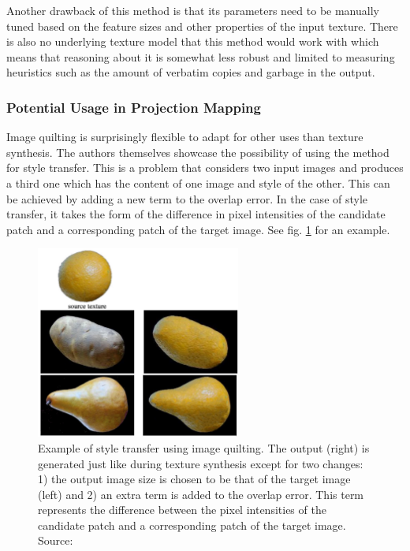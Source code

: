 Another drawback of this method is that its parameters need to be manually tuned based on the feature sizes and other properties of the input texture. There is also no underlying texture model that this method would work with which means that reasoning about it is somewhat less robust and limited to measuring heuristics such as the amount of verbatim copies and garbage in the output.

\subsubsection{Potential Usage in Projection Mapping}
\label{section:background-texture_synthesis-patch_based-projection_mapping}

Image quilting is surprisingly flexible to adapt for other uses than texture synthesis. The authors themselves showcase the possibility of using the method for style transfer. This is a problem that considers two input images and produces a third one which has the content of one image and style of the other. This can be achieved by adding a new term to the overlap error. In the case of style transfer, it takes the form of the difference in pixel intensities of the candidate patch and a corresponding patch of the target image. See fig. \ref{fig:background_quilting_transfer} for an example.

\begin{figure}[ht]
    \centering
    \includegraphics[width=0.6\textwidth]{images/02-quilting_transfer_compressed.jpg}
    \caption{Example of style transfer using image quilting. The output (right) is generated just like during texture synthesis except for two changes: 1) the output image size is chosen to be that of the target image (left) and 2) an extra term is added to the overlap error. This term represents the difference between the pixel intensities of the candidate patch and a corresponding patch of the target image. Source: \citet{Efros2001}}
    \label{fig:background_quilting_transfer}
\end{figure}

